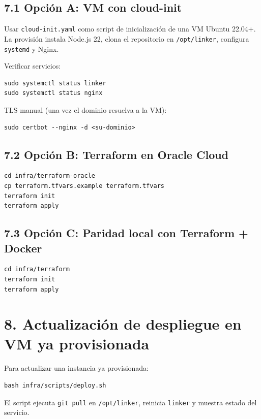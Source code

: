 \documentclass[12pt]{article}
\begin{document}
\subsection{7.1 Opción A: VM con cloud-init}

Usar \texttt{cloud-init.yaml} como script de inicialización de una VM Ubuntu 22.04+.
La provisión instala Node.js 22, clona el repositorio en \texttt{/opt/linker},
configura \texttt{systemd} y Nginx.

Verificar servicios:

\begin{lstlisting}
sudo systemctl status linker
sudo systemctl status nginx
\end{lstlisting}

TLS manual (una vez el dominio resuelva a la VM):

\begin{lstlisting}
sudo certbot --nginx -d <su-dominio>
\end{lstlisting}

\subsection{7.2 Opción B: Terraform en Oracle Cloud}

\begin{lstlisting}
cd infra/terraform-oracle
cp terraform.tfvars.example terraform.tfvars
terraform init
terraform apply
\end{lstlisting}

\subsection{7.3 Opción C: Paridad local con Terraform + Docker}

\begin{lstlisting}
cd infra/terraform
terraform init
terraform apply
\end{lstlisting}

\section{8. Actualización de despliegue en VM ya provisionada}

Para actualizar una instancia ya provisionada:

\begin{lstlisting}
bash infra/scripts/deploy.sh
\end{lstlisting}

El script ejecuta \texttt{git pull} en \texttt{/opt/linker}, reinicia \texttt{linker}
y muestra estado del servicio.
\end{document}
